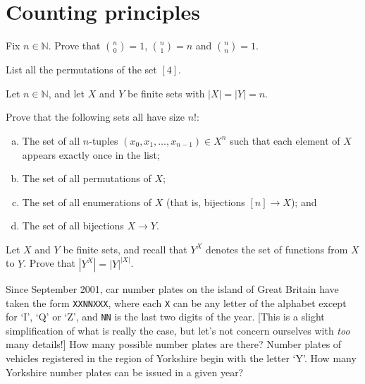 \section{Counting principles}



\begin{exercise}
Fix $n \in \mathbb{N}$. Prove that $\binom{n}{0} = 1$, $\binom{n}{1} = n$ and $\binom{n}{n} = 1$.
\end{exercise}


\begin{exercise}
List all the permutations of the set $[4]$.
\end{exercise}


\begin{exercise}
\label{exOtherCharacterisationsOfFactorial}
Let $n \in \mathbb{N}$, and let $X$ and $Y$ be finite sets with $|X|=|Y|=n$.

Prove that the following sets all have size $n!$:
\begin{enumerate}[(a)]
\item The set of all $n$-tuples $(x_0,x_1,\dots,x_{n-1}) \in X^n$ such that each element of $X$ appears exactly once in the list;
\item The set of all permutations of $X$;
\item The set of all enumerations of $X$ (that is, bijections $[n] \to X$); and
\item The set of all bijections $X \to Y$.
\end{enumerate}
\end{exercise}

\begin{exercise}
Let $X$ and $Y$ be finite sets, and recall that $Y^X$ denotes the set of functions from $X$ to $Y$. Prove that $|Y^X|=|Y|^{|X|}$.
\end{exercise}

\begin{exercise}
Since September 2001, car number plates on the island of Great Britain have taken the form \texttt{XX\;NN\;XXX}, where each \texttt{X} can be any letter of the alphabet except for `I', `Q' or `Z', and \texttt{NN} is the last two digits of the year. [This is a slight simplification of what is really the case, but let's not concern ourselves with \textit{too} many details!] How many possible number plates are there? Number plates of vehicles registered in the region of Yorkshire begin with the letter `Y'. How many Yorkshire number plates can be issued in a given year?
\end{exercise}


